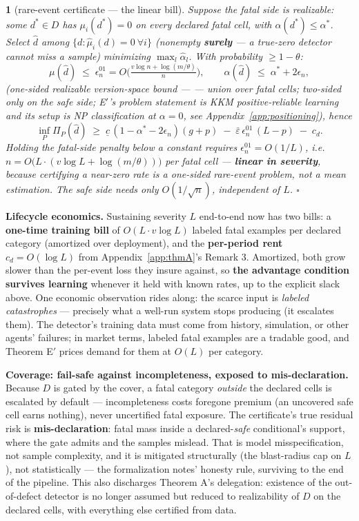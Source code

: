 \documentclass[11pt]{article}
\theoremstyle{plain}
\newtheorem*{namedthminner}{\namedthmname}
\newenvironment{nthm}[1]{\def\namedthmname{#1}\begin{namedthminner}}{\end{namedthminner}}
\theoremstyle{definition}
\begin{document}
\begin{nthm}{Theorem E$'$}[rare-event certificate --- the linear bill]
Suppose the fatal
side is realizable: some $d^* \in D$ has $\mu_i(d^*) = 0$ on every declared
fatal cell, with $\alpha(d^*) \leq \alpha^*$. Select $\hat d$ among
$\{d : \hat\mu_i(d) = 0\ \forall i\}$ (nonempty \textbf{surely} --- a true-zero
detector cannot miss a sample) minimizing $\max_l \hat\alpha_l$. With
probability $\geq 1-\theta$:
$$\mu(\hat d) \;\leq\; \epsilon^{01}_n = O\!\Big(\tfrac{v \log n + \log(m/\theta)}{n}\Big), \qquad \alpha(\hat d) \;\leq\; \alpha^* + 2\epsilon_n,$$
(one-sided realizable version-space bound --- \citealt[Thm 2.1]{blumer1989} --- union over
fatal cells; two-sided only on the safe side; E$'$'s problem statement is
KKM positive-reliable learning and its setup is NP classification at
$\alpha = 0$, see Appendix~\ref{app:positioning}), hence
$$\inf_{P} \Pi_P(\hat d) \;\geq\; \underline c\,(1 - \alpha^* - 2\epsilon_n)(g+p) \;-\; \bar\varepsilon\,\epsilon^{01}_n\,(L-p) \;-\; c_d.$$
Holding the fatal-side penalty below a constant requires
$\epsilon^{01}_n = O(1/L)$, i.e.\ $n = O\big(L \cdot (v\log L + \log(m/\theta))\big)$
per fatal cell --- \textbf{linear in severity}, because certifying a near-zero rate
is a one-sided rare-event problem, not a mean estimation. The safe side needs
only $O(1/\sqrt{n})$, independent of $L$. \qquad $\square$
\end{nthm}

\textbf{Lifecycle economics.} Sustaining severity $L$ end-to-end now has two
bills: a \textbf{one-time training bill} of $O(L \cdot v \log L)$ labeled fatal
examples per declared category (amortized over deployment), and the
\textbf{per-period rent} $c_d = O(\log L)$ from Appendix~\ref{app:thmA}'s Remark 3. Amortized, both
grow slower than the per-event loss they insure against, so \textbf{the advantage
condition survives learning} whenever it held with known rates, up to the
explicit slack above. One economic observation rides along: the scarce input
is \emph{labeled catastrophes} --- precisely what a well-run system stops producing
(it escalates them). The detector's training data must come from history,
simulation, or other agents' failures; in market terms, labeled fatal
examples are a tradable good, and Theorem E$'$ prices demand for them at
$O(L)$ per category.

\textbf{Coverage: fail-safe against incompleteness, exposed to mis-declaration.}
Because $D$ is gated by the cover, a fatal category \emph{outside} the declared
cells is escalated by default --- incompleteness costs foregone premium (an
uncovered safe cell earns nothing), never uncertified fatal exposure. The
certificate's true residual risk is \textbf{mis-declaration}: fatal mass inside a
declared-\emph{safe} conditional's support, where the gate admits and the samples
mislead. That is model misspecification, not sample complexity, and it is
mitigated structurally (the blast-radius cap on $L$), not statistically ---
the formalization notes' honesty rule, surviving to the end of the pipeline.
This also discharges Theorem A's delegation: existence of the out-of-defect
detector is no longer assumed but reduced to realizability of $D$ on the
declared cells, with everything else certified from data.
\end{document}

